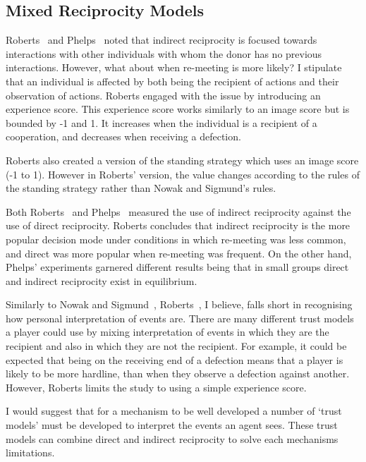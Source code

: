 \documentclass[]{final_report}
\begin{document}
\subsection{Mixed Reciprocity Models}
Roberts~\cite{evoldirindir} and Phelps~\cite{phelps_game_theoretic_analysis} noted that indirect reciprocity is focused towards interactions with other individuals with whom the donor has no previous interactions. However, what about when re-meeting is more likely? I stipulate that an individual is affected by both being the recipient of actions and their observation of actions. Roberts engaged with the issue by introducing an experience score. This experience score works similarly to an image score but is bounded by -1 and 1. It increases when the individual is a recipient of a cooperation, and decreases when receiving a defection.\par
Roberts also created a version of the standing strategy which uses an image score (-1 to 1). However in Roberts' version, the value changes according to the rules of the standing strategy rather than Nowak and Sigmund's rules.\par
Both Roberts~\cite{evoldirindir} and Phelps~\cite{phelps_game_theoretic_analysis} measured the use of indirect reciprocity against the use of direct reciprocity. Roberts concludes that indirect reciprocity is the more popular decision mode under conditions in which re-meeting was less common, and direct was more popular when re-meeting was frequent. On the other hand, Phelps' experiments garnered different results being that in small groups direct and indirect reciprocity exist in equilibrium.\par
Similarly to Nowak and Sigmund~\cite{evol_indirect_image}, Roberts~\cite{evoldirindir}, I believe, falls short in recognising how personal interpretation of events are. There are many different trust models a player could use by mixing interpretation of events in which they are the recipient and also in which they are not the recipient. For example, it could be expected that being on the receiving end of a defection means that a player is likely to be more hardline, than when they observe a defection against another. However, Roberts limits the study to using a simple experience score.\par
I would suggest that for a mechanism to be well developed a number of `trust models' must be developed to interpret the events an agent sees. These trust models can combine direct and indirect reciprocity to solve each mechanisms limitations.
\end{document}
